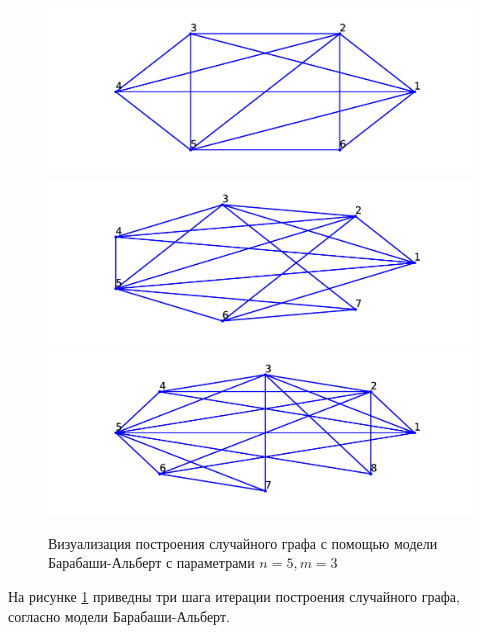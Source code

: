 \begin{figure}[H] 
    \includegraphics[scale=0.4]{ba1.pdf} 
    \includegraphics[scale=0.4]{ba2.pdf} 
    \includegraphics[scale=0.4]{ba3.pdf} 
    \caption{Визуализация построения 
    случайного графа с помощью модели Барабаши-Альберт с параметрами
$n=5,m=3$}
\label{ba_4}
\end{figure} 
На рисунке \ref{ba_4} приведны три шага итерации построения
случайного графа, согласно модели Барабаши-Альберт.
